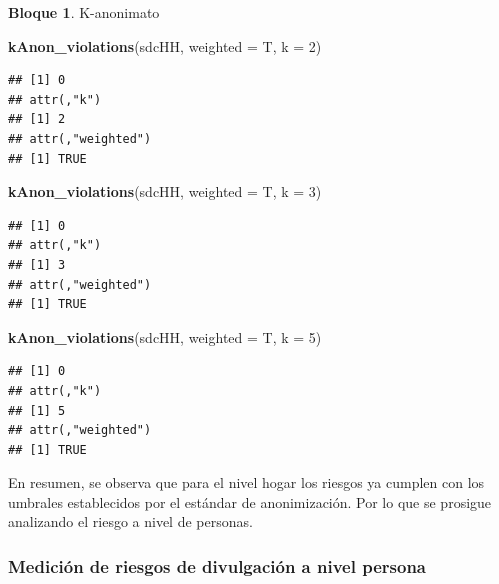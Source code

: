 \documentclass[]{book}
\newenvironment{Shaded}{\begin{snugshade}}{\end{snugshade}}
\newcommand{\DataTypeTok}[1]{\textcolor[rgb]{0.13,0.29,0.53}{#1}}
\newcommand{\DecValTok}[1]{\textcolor[rgb]{0.00,0.00,0.81}{#1}}
\newcommand{\KeywordTok}[1]{\textcolor[rgb]{0.13,0.29,0.53}{\textbf{#1}}}
\newcommand{\NormalTok}[1]{#1}
\theoremstyle{definition}
\theoremstyle{definition}
\newtheorem{example}{Bloque}[chapter]
\theoremstyle{definition}
\theoremstyle{definition}
\theoremstyle{remark}
\begin{document}
\begin{example}
\protect\hypertarget{exm:bloque47nbm}{}{\label{exm:bloque47nbm} }K-anonimato
\end{example}

\begin{Shaded}
\begin{Highlighting}[]
\KeywordTok{kAnon_violations}\NormalTok{(sdcHH, }\DataTypeTok{weighted =}\NormalTok{ T, }\DataTypeTok{k =} \DecValTok{2}\NormalTok{)}
\end{Highlighting}
\end{Shaded}

\begin{verbatim}
## [1] 0
## attr(,"k")
## [1] 2
## attr(,"weighted")
## [1] TRUE
\end{verbatim}

\begin{Shaded}
\begin{Highlighting}[]
\KeywordTok{kAnon_violations}\NormalTok{(sdcHH, }\DataTypeTok{weighted =}\NormalTok{ T, }\DataTypeTok{k =} \DecValTok{3}\NormalTok{)}
\end{Highlighting}
\end{Shaded}

\begin{verbatim}
## [1] 0
## attr(,"k")
## [1] 3
## attr(,"weighted")
## [1] TRUE
\end{verbatim}

\begin{Shaded}
\begin{Highlighting}[]
\KeywordTok{kAnon_violations}\NormalTok{(sdcHH, }\DataTypeTok{weighted =}\NormalTok{ T, }\DataTypeTok{k =} \DecValTok{5}\NormalTok{)}
\end{Highlighting}
\end{Shaded}

\begin{verbatim}
## [1] 0
## attr(,"k")
## [1] 5
## attr(,"weighted")
## [1] TRUE
\end{verbatim}

En resumen, se observa que para el nivel hogar los riesgos ya cumplen con los umbrales establecidos por el estándar de anonimización. Por lo que se prosigue analizando el riesgo a nivel de personas.

\hypertarget{mediciuxf3n-de-riesgos-de-divulgaciuxf3n-a-nivel-persona}{%
\subsubsection{Medición de riesgos de divulgación a nivel persona}\label{mediciuxf3n-de-riesgos-de-divulgaciuxf3n-a-nivel-persona}}
\end{document}
